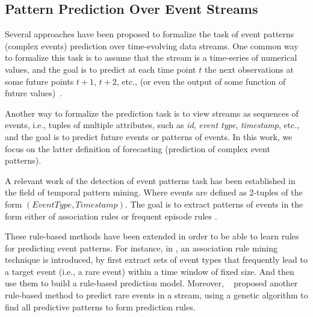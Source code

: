 

\subsection{Pattern Prediction Over Event Streams}

\par Several approaches have been proposed to formalize the task of event patterns (complex events) prediction over time-evolving data streams.  One common way to formalize this task is to assume that the stream is a time-series of numerical values, and the goal is to predict at each time point $t$ the next observations at some future points $t+1$, $t+2$, etc., (or even the output of some function of future values)~\cite{montgomery_introduction_2015}. 



Another way to formalize the prediction task is to view streams as sequences of events,
i.e., tuples of multiple attributes, such as \textit{id}, \textit{event type}, \textit{timestamp}, etc., and the goal is to predict future events or  patterns of events. In this work, we focus on the latter definition of forecasting (prediction of complex event patterns).  

\par A relevant work of the detection of event patterns task has been established in the field of temporal pattern mining. Where events are defined as 2-tuples of the form \((\mathit{EventType}, \mathit{Timestamp})\). The goal is to extract patterns of events in the form either of association rules \cite{agrawal_mining_1993} or frequent episode rules \cite{mannila_discovery_1997}. 

\par These rule-based methods have been extended in order to be able to learn rules for predicting event patterns. For instance, in \cite{vilalta_predicting_2002}, an association rule mining technique is introduced, by first extract sets of event types that frequently lead to a target event (i.e., a rare event) within a time window of fixed size. And then use them to build a rule-based prediction model. Moreover,  ~\citet{weiss1998learning} proposed another rule-based method to predict rare events in a stream, using a genetic algorithm to find all predictive patterns to form prediction rules.  


